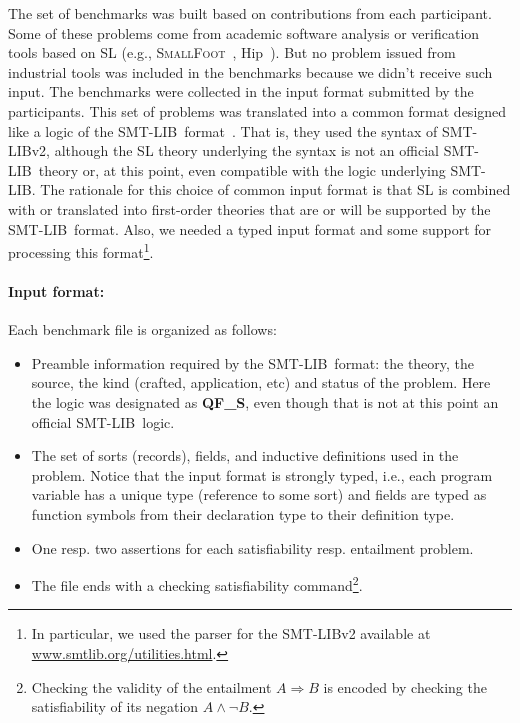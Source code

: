 \documentclass[twoside,11pt]{article}
\newcommand{\limp}{\Rightarrow}
\newcommand{\smtlib}{\textsf{SMT-LIB}}
\begin{document}
The set of benchmarks was built based on contributions from each participant. 
Some of these problems come from academic software analysis or verification tools based on SL 
(e.g., \textsc{SmallFoot}~\cite{SmallFootsite}, \textsf{Hip}~\cite{ChinDNQ12}).
But no problem issued from industrial tools was included in the benchmarks because we didn't receive such input.
The benchmarks were collected in the input format submitted by the participants. 
This set of problems was translated into a common format designed like a logic of the \smtlib\ format~\cite{BarST-SMTLIB}.
That is, they used the syntax of \smtlib v2, although the SL theory underlying the syntax is not an official \smtlib\ theory or, at this point, even compatible with the logic underlying \smtlib.
The rationale for this choice of common input format is 
that SL is combined with or translated into first-order theories that are or will be supported by the \smtlib\ format.
Also, we needed a typed input format and some support for processing this format\footnote{In particular, we used the parser for the \smtlib v2 available at \url{www.smtlib.org/utilities.html}.}.
 
\paragraph{Input format:} Each benchmark file is organized as follows:
\begin{itemize}
\item Preamble information required by the \smtlib\ format: the theory, the source, the kind (crafted, application, etc) and status of the problem.  Here the logic was designated as \textbf{QF\_S}, even though that is not at this point an official \smtlib\ logic. 
\item The set of sorts (records), fields, and inductive definitions used in the problem. Notice that the input format is strongly typed, i.e., each program variable has a unique type (reference to some sort) and 
fields are typed as function symbols from their declaration type to their definition type. 
\item One resp. two assertions for each satisfiability resp. entailment problem. 
\item The file ends with a checking satisfiability command\footnote{Checking the validity of the entailment $A\limp B$ is encoded by checking the satisfiability of its negation $A \land \lnot B$.}.
\end{itemize}
\end{document}
